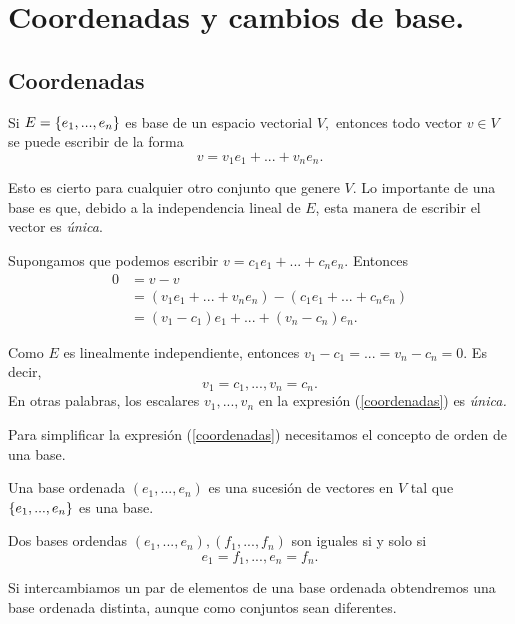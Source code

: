 \section{Coordenadas y cambios de base.}
\label{sec:coordenadas}

\subsection*{Coordenadas}

Si $E=\left\{ e_{1},...,e_{n} \right\}$ es base de un espacio vectorial $V,$ entonces todo vector $v\in V$ se puede escribir de la
forma
\[
 \label{coordenadas}
 v=v_{1}e_{1}+...+v_{n}e_{n}.
\]

Esto es cierto para cualquier otro conjunto que genere $V.$ Lo importante de una base es que, debido a la independencia
lineal de $E$, esta manera de escribir el vector es \emph{única}.

Supongamos que podemos escribir $v=c_{1}e_{1}+...+c_{n}e_{n}.$ Entonces
\begin{align*}
 0&=v-v \\
 &=(v_{1}e_{1}+...+v_{n}e_{n})-(c_{1}e_{1}+...+c_{n}e_{n}) \\
&=(v_{1}-c_{1})e_{1}+...+(v_{n}-c_{n})e_{n}.
\end{align*}

Como $E$ es linealmente independiente, entonces $v_{1}-c_{1}=...=v_{n}-c_{n}=0.$ Es decir,
$$
v_{1}=c_{1},  ...,v_{n}=c_{n}.
$$
En otras palabras, los escalares $v_{1},...,v_{n}$ en la expresi\'on (\ref{coordenadas}) es \emph{única.}

Para simplificar la expresi\'on (\ref{coordenadas}) necesitamos el concepto de orden de una base.

\begin{definicion}
 Una base ordenada $\left( e_{1},...,e_{n} \right)$ es una sucesi\'on de vectores en $V$ tal que
 $\left\{ e_{1},...,e_{n} \right\}$ es una base.

 Dos bases ordendas $\left( e_{1},...,e_{n} \right), \left( f_{1},...,f_{n} \right)$ son iguales si y solo si
$$e_{1}=f_{1},..., e_{n}=f_{n}.$$
\end{definicion}

\begin{observacion}
 Si intercambiamos un par de elementos de una base ordenada obtendremos una base ordenada distinta, aunque como
conjuntos sean diferentes.
\end{observacion}

